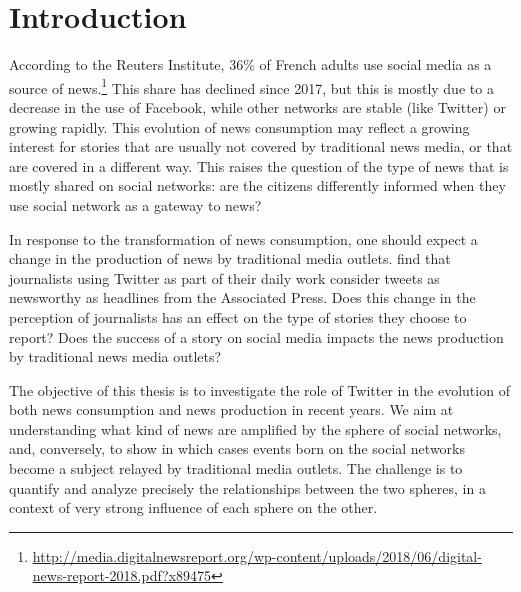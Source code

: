 \chapter{Introduction}
According to the Reuters Institute, 36\% of French adults use social media as a source of news.\footnote{\url{http://media.digitalnewsreport.org/wp-content/uploads/2018/06/digital-news-report-2018.pdf?x89475}}  This share has declined since 2017, but this is mostly due to a decrease in the use of Facebook, while other networks are stable (like Twitter) or growing rapidly. This evolution of news consumption may reflect a growing interest for stories that are usually not covered by traditional news media, or that are covered in a different way. This raises the question of the type of news that is mostly shared on social networks: are the citizens differently informed when they use social network as a gateway to news? 

In response to the transformation of news consumption, one should expect a change in the production of news by traditional media outlets. \citet{mcgregor_twitter_2018} find that journalists using Twitter as part of their daily work consider tweets as newsworthy as headlines from the Associated Press. Does this change in the perception of journalists has an effect on the type of stories they choose to report? Does the success of a story on social media impacts the news production by traditional news media outlets?


The objective of this thesis is to investigate the role of Twitter in the evolution of both news consumption and news production in recent years. We aim at understanding what kind of news are  amplified by the sphere of social networks, and, conversely, to show in which cases events born on the social networks become a subject relayed by traditional media outlets. The challenge is to quantify and analyze precisely the relationships between the two spheres, in a context of very strong influence of each sphere on the other. 


